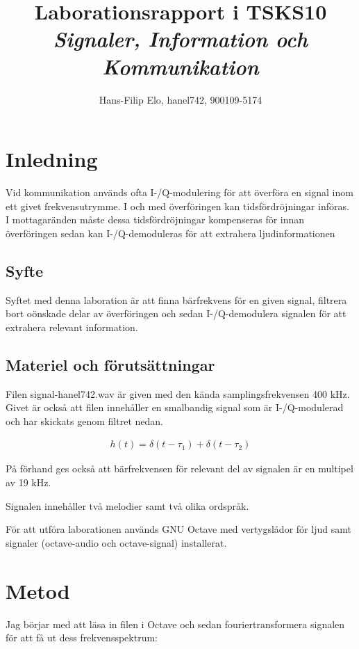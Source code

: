 \documentclass[10pt,twocolumn]{article}
\title{Laborationsrapport i TSKS10 \emph{Signaler, Information och Kommunikation}}
\author{Hans-Filip Elo, hanel742, 900109-5174}
\begin{document}
\maketitle

\section{Inledning}

Vid kommunikation används ofta I-/Q-modulering för att överföra en signal inom ett givet frekvensutrymme. I och med överföringen kan tidsfördröjningar införas. I mottagaränden måste dessa tidsfördröjningar kompenseras för innan överföringen sedan kan I-/Q-demoduleras för att extrahera ljudinformationen 

\subsection{Syfte}

Syftet med denna laboration är att finna bärfrekvens för en given signal, filtrera bort oönskade delar av överföringen och sedan I-/Q-demodulera signalen för att extrahera relevant information. 

\subsection{Materiel och förutsättningar}

Filen signal-hanel742.wav är given med den kända samplingsfrekvensen 400 kHz. Givet är också att filen innehåller en smalbandig signal som är I-/Q-modulerad och har skickats genom filtret nedan. 

\begin{gather}
h(t) = \delta(t - \tau_1) + \delta(t - \tau_2)
\label{equ:filter}
\end{gather}

På förhand ges också att bärfrekvensen för relevant del av signalen är en multipel av 19 kHz.

Signalen innehåller två melodier samt två olika ordspråk. 

För att utföra laborationen används GNU Octave med vertygslådor för ljud samt signaler (octave-audio och octave-signal) installerat. 

\section{Metod}

Jag börjar med att läsa in filen i Octave och sedan fouriertransformera signalen för att få ut dess frekvensspektrum: 
\end{document}
